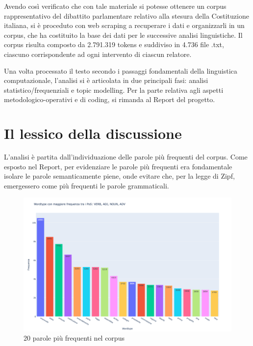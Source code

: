 \documentclass{article}
\begin{document}
Avendo così verificato che con tale materiale si potesse ottenere un corpus rappresentativo del dibattito parlamentare relativo alla stesura della Costituzione italiana, si è proceduto con web scraping a recuperare i dati e organizzarli in un corpus, che ha costituito la base dei dati per le successive analisi linguistiche.
Il corpus risulta composto da 2.791.319 tokens e suddiviso in 4.736 file .txt, ciascuno corrispondente ad ogni intervento di ciascun relatore. 

Una volta processato il testo secondo i passaggi fondamentali della linguistica computazionale, l’analisi si è articolata in due principali fasi: analisi statistico/frequenziali e topic modelling. Per la parte relativa agli aspetti metodologico-operativi e di coding, si rimanda al Report del progetto.


\section{Il lessico della discussione}

L'analisi è partita dall'individuazione delle parole più frequenti del corpus. Come esposto nel Report, per evidenziare le parole più frequenti era fondamentale isolare le parole semanticamente piene, onde evitare che, per la legge di Zipf, emergessero come più frequenti le parole grammaticali.

\begin{figure}[H]
    \centering
    \includegraphics[width=1.1\linewidth]{newplot.png}
    \caption{20 parole più frequenti nel corpus}
    \label{fig:enter-label}
\end{figure}
\end{document}
